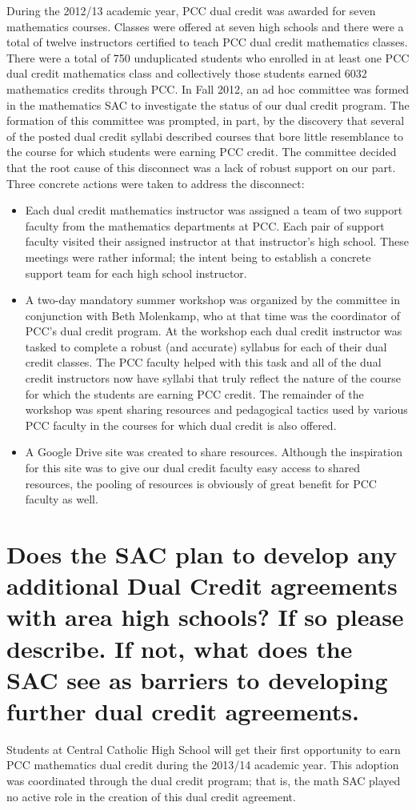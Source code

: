 During the 2012/13 academic year, PCC dual credit was awarded
for seven mathematics courses.  Classes were offered at seven high schools and
there were a total of twelve instructors certified to teach PCC dual credit
mathematics classes.  There were a total of 750 unduplicated students who
enrolled in at least one PCC dual credit mathematics class and collectively
those students earned 6032 mathematics credits through PCC.
In Fall 2012, an ad hoc committee was formed in the mathematics SAC to investigate the status of our dual credit program.  The formation of this committee was prompted, in part, by the discovery that several of the posted dual credit syllabi described courses that bore little resemblance to the course for which students were earning PCC credit.  The committee decided that the root cause of this disconnect was a lack of robust support on our part.  Three concrete actions were taken to address the disconnect:
\begin{itemize}
\item Each dual credit mathematics instructor was assigned a team of two support
  faculty from the mathematics departments at PCC.  Each pair of support faculty
  visited their assigned instructor at that instructor's high school.  These
  meetings were rather informal; the intent being to establish a concrete
  support team for each high school instructor.
\item A two-day mandatory summer workshop was organized by the committee in
  conjunction with Beth Molenkamp, who at that time was the coordinator of
  PCC's dual credit program.  At the workshop each dual credit instructor was
  tasked to complete a robust (and accurate) syllabus for each of their dual
  credit classes.  The PCC faculty helped with this task and all of the dual
  credit instructors now have syllabi that truly reflect the nature of the
  course for which the students are earning PCC credit.  The remainder of the
  workshop was spent sharing resources and pedagogical tactics used by various
  PCC faculty in the courses for which dual credit is also offered.
\item A Google Drive site was created to share resources.  Although the
  inspiration for this site was to give our dual credit faculty easy access to
  shared resources, the pooling of resources is obviously of great benefit for
  PCC faculty as well.
\end{itemize}

\section[Future dual credit relationships]{Does the SAC plan to develop any
additional Dual Credit agreements with area high schools?  If so please
describe.   If not, what does the SAC see as barriers to developing further dual
credit agreements. }
Students at Central Catholic High School will get their first opportunity to
earn PCC mathematics dual credit during the 2013/14 academic year.  This
adoption was coordinated through the dual credit program; that is, the math SAC
played no active role in the creation of this dual credit agreement.

